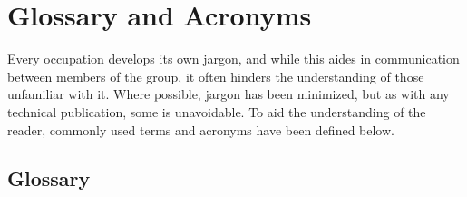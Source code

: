 \chapter{Glossary and Acronyms}
\label{app:glossary}

Every occupation develops its own jargon, and while this aides in communication
between members of the group, it often hinders the understanding of those
unfamiliar with it. Where possible, jargon has been minimized, but as with any
technical publication, some is unavoidable. To aid the understanding of the
reader, commonly used terms and acronyms have been defined below.

\section{Glossary}
\label{sec:gloassary}

